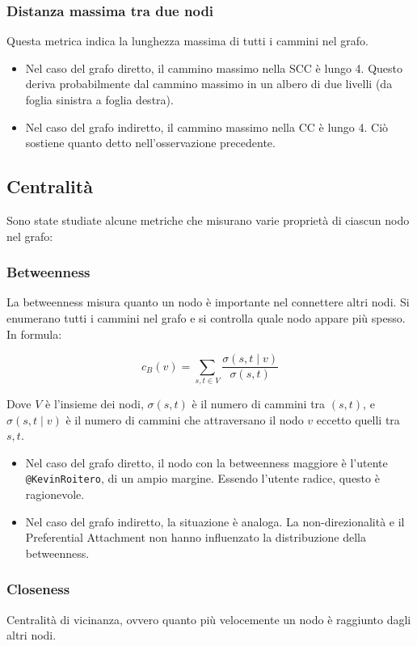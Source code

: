 \documentclass[a4paper, 11pt, twoside]{article}
\begin{document}
\subsubsection{Distanza massima tra due nodi}
Questa metrica indica la lunghezza massima di tutti i cammini nel grafo.
\begin{itemize}
    \item Nel caso del grafo diretto, il cammino massimo nella SCC è lungo 4. Questo deriva probabilmente dal cammino massimo in un albero di due livelli (da foglia sinistra a foglia destra).
    \item Nel caso del grafo indiretto, il cammino massimo nella CC è lungo 4. Ciò sostiene quanto detto nell'osservazione precedente.
\end{itemize}

\subsection{Centralità}
Sono state studiate alcune metriche che misurano varie proprietà di ciascun nodo nel grafo:

\subsubsection{Betweenness}
La betweenness misura quanto un nodo è importante nel connettere altri nodi. Si enumerano tutti i cammini nel grafo e si controlla quale nodo appare più spesso. In formula:

$$
    c_B(v)=\sum_{s,t\in V}\frac{\sigma(s,t\mid v)}{\sigma(s,t)}
$$

Dove $V$ è l'insieme dei nodi, $\sigma(s,t)$ è il numero di cammini tra $(s,t)$, e $\sigma(s,t\mid v)$ è il numero di cammini che attraversano il nodo $v$ eccetto quelli tra $s,t$.

\begin{itemize}
    \item Nel caso del grafo diretto, il nodo con la betweenness maggiore è l'utente \texttt{@KevinRoitero}, di un ampio margine. Essendo l'utente radice, questo è ragionevole.
    \item Nel caso del grafo indiretto, la situazione è analoga. La non-direzionalità e il Preferential Attachment non hanno influenzato la distribuzione della betweenness.
\end{itemize}

\subsubsection{Closeness}
Centralità di vicinanza, ovvero quanto più velocemente un nodo è raggiunto dagli altri nodi.
\end{document}
